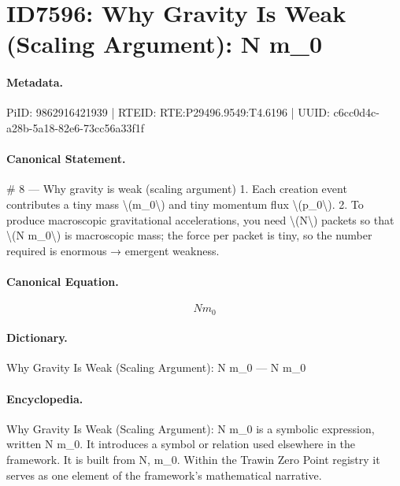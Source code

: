 \section*{ID7596: Why Gravity Is Weak (Scaling Argument): N m\_0}
\paragraph{Metadata.}
PiID: 9862916421939 | RTEID: RTE:P29496.9549:T4.6196 | UUID: c6cc0d4c-a28b-5a18-82e6-73cc56a33f1f

\paragraph{Canonical Statement.}
\# 8 — Why gravity is weak (scaling argument) 1. Each creation event contributes a tiny mass \textbackslash{}(m\_0\textbackslash{}) and tiny momentum flux \textbackslash{}(p\_0\textbackslash{}). 2. To produce macroscopic gravitational accelerations, you need \textbackslash{}(N\textbackslash{}) packets so that \textbackslash{}(N m\_0\textbackslash{}) is macroscopic mass; the force per packet is tiny, so the number required is enormous → emergent weakness.

\paragraph{Canonical Equation.}
\[
N m_0
\]

\paragraph{Dictionary.}
Why Gravity Is Weak (Scaling Argument): N m\_0 — N m\_0

\paragraph{Encyclopedia.}
Why Gravity Is Weak (Scaling Argument): N m\_0 is a symbolic expression, written N m\_0. It introduces a symbol or relation used elsewhere in the framework. It is built from N, m\_0. Within the Trawin Zero Point registry it serves as one element of the framework's mathematical narrative.
